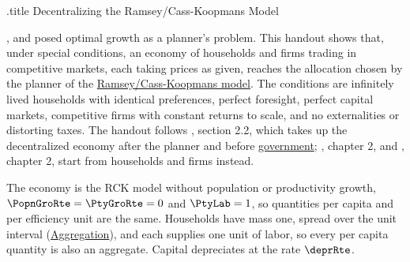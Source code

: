 \documentclass{econark}
\begin{document}
\handoutHeader

\begin{verbatimwrite}{\jobname.title}
  Decentralizing the Ramsey/Cass-Koopmans Model
\end{verbatimwrite}

\handoutNameMake

\citet{ramseySave}, \citet{cass:growth} and \citet{koopmans:growth} posed optimal growth as a planner's problem. This handout shows that, under special conditions, an economy of households and firms trading in competitive markets, each taking prices as given, reaches the allocation chosen by the planner of the \href{https://intertemporal-choice.github.io/content/growth/ramseycasskoopmans/}{Ramsey/Cass-Koopmans model}. The conditions are infinitely lived households with identical preferences, perfect foresight, perfect capital markets, competitive firms with constant returns to scale, and no externalities or distorting taxes. The handout follows \citet{blanchard&fischer:text}, section 2.2, which takes up the decentralized economy after the planner and before \href{https://intertemporal-choice.github.io/content/growth/rckwithgov/}{government}; \citet{romer:text}, chapter 2, and \citet{barro&salaimartin:book}, chapter 2, start from households and firms instead.

The economy is the RCK model without population or productivity growth, $\PopnGroRte=\PtyGroRte=0$ and $\PtyLab=1$, so quantities per capita and per efficiency unit are the same. Households have mass one, spread over the unit interval (\href{https://intertemporal-choice.github.io/content/appendices/mathematical/aggregation/}{Aggregation}), and each supplies one unit of labor, so every per capita quantity is also an aggregate. Capital depreciates at the rate $\deprRte$.
\end{document}
